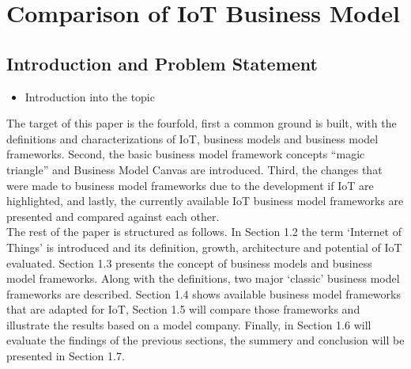 
\chapter{Comparison of IoT Business Model}


\newpage

\minitoc %

\newpage
\renewcommand{\labelitemii}{$\diamond$}
\renewcommand{\labelitemiii}{$\circ$}
\section{Introduction and Problem Statement}
	\begin{itemize}
		\item Introduction into the topic
	\end{itemize}

The target of this paper is the fourfold, first a common ground is built, with the definitions and characterizations of IoT, business models and business model frameworks. Second, the basic business model framework concepts ``magic triangle'' and  Business Model Canvas are introduced. Third, the changes that were made to business model frameworks due to the development if IoT are highlighted, and lastly, the currently available IoT business model frameworks are presented and compared against each other.\\
The rest of the paper is structured as follows. In Section 1.2 the term `Internet of Things' is introduced and its definition, growth, architecture and potential of IoT evaluated. Section 1.3 presents the concept of business models and business model frameworks. Along with the definitions, two major `classic' business model frameworks are described. Section 1.4 shows available business model frameworks that are adapted for IoT, Section 1.5 will compare those frameworks and illustrate the results based on a model company. Finally, in Section 1.6 will evaluate the findings of the previous sections, the summery and conclusion will be presented in Section 1.7. 
 
